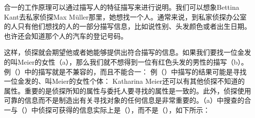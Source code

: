 合一的工作原理可以通过描写人的特征描写来进行说明。我们可以想象Bettina Kant去私家侦探Max Müller那里，她想找一个人。通常来说，到私家侦探办公室的人只有他们想找的人的一部分描写信息，比如说性别、头发颜色或者出生日期。也许还会知道那个人的汽车的登记号码。

这样，侦探就会期望他或者她能够提供出符合描写的信息。如果我们要找一位金发的叫Meier的女性（a），那么我们就不想得到一位有红色头发的男性的描写（b）。例（）中的描写就是不兼容的，而且不能合一：
\eal
\ex\label{ex-meier-female-blonde}
\ex {}
\zl
例（）中描写的结果可能是寻找一位金发的、叫Meier的女性个体：
\ea
\label{info-detective}
\z
Katharina Meier还可以有其他侦探不知道的属性。重要的是侦探所知的属性与委托人要寻找的属性是一致的。此外，侦探使用可靠的信息而不是制造出有关寻找对象的任何信息是非常重要的。（a）中搜查的合一与（）中侦探可获得的信息实际上是（），而不是（），如下所示：
